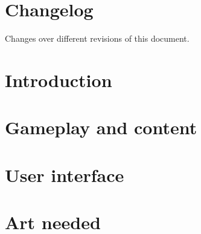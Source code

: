 \documentclass[a4paper, 11pt]{article}
\title{\titlename}
\author{\authorname}
\begin{document}


\tableofcontents
\cleardoublepage

\section{Changelog}
\label{sec:changelog} 

Changes over different revisions of this document.



\section{Introduction}
\label{sec:introduction}


\section{Gameplay and content}
\label{sec:gameplay}


\section{User interface}
\label{sec:interface}
%

\section{Art needed}
\label{sec:art}
%
\end{document}
